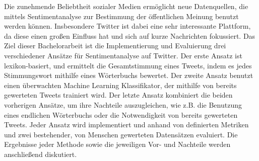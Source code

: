Die zunehmende Beliebtheit sozialer Medien ermöglicht neue Datenquellen, die mittels Sentimentanalyse zur Bestimmung der öffentlichen Meinung benutzt werden können. Insbesondere Twitter ist dabei eine sehr interessante Plattform, da diese einen großen Einfluss hat und sich auf kurze Nachrichten fokussiert. Das Ziel dieser Bachelorarbeit ist die Implementierung und Evaluierung drei verschiedener Ansätze für Sentimentanalyse auf Twitter. Der erste Ansatz ist lexikon-basiert, und ermittelt die Gesamtstimmung eines Tweets, indem es jedes Stimmungswort mithilfe eines Wörterbuchs bewertet. Der zweite Ansatz benutzt einen überwachten Machine Learning Klassifikator, der mithilfe von bereits gewerteten Tweets trainiert wird. Der letzte Ansatz kombiniert die beiden vorherigen Ansätze, um ihre Nachteile auszugleichen, wie z.B. die Benutzung eines endlichen Wörterbuchs oder die Notwendigkeit von bereits gewerteten Tweets. Jeder Ansatz wird implementiert und anhand von definierten Metriken und zwei bestehender, von Menschen gewerteten Datensätzen evaluiert. Die Ergebnisse jeder Methode sowie die jeweiligen Vor- und Nachteile werden anschließend diskutiert.












